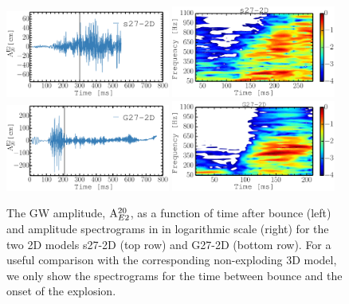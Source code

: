\begin{figure}
\includegraphics[width=0.48\textwidth]{./images/chp1/fig8a.pdf}
\includegraphics[width=0.48\textwidth]{./images/chp1/fig8b.pdf} \\
\includegraphics[width=0.48\textwidth]{./images/chp1/fig8c.pdf}
\includegraphics[width=0.48\textwidth]{./images/chp1/fig8d.pdf}
\caption{The GW amplitude, $\mathrm{A}_{\mathrm\mathrm{E2}}^{\mathrm{20}}$, as a function of time after bounce (left)
and amplitude spectrograms in in logarithmic scale (right) for the two 2D models s27-2D (top row) and G27-2D (bottom row). 
For a useful comparison with the corresponding non-exploding 3D model, we only
show the spectrograms for the time between bounce and the onset of the explosion.
\label{fig:s272d}}
\end{figure}

